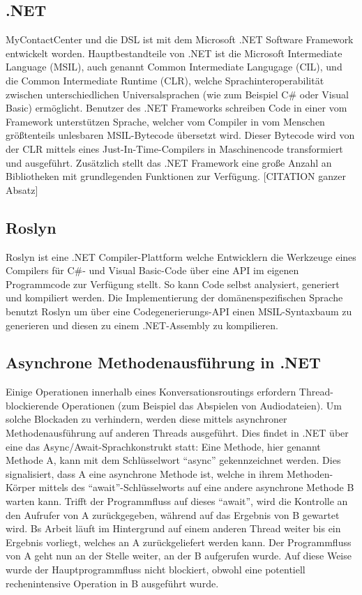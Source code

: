 \subsection{.NET}
MyContactCenter und die DSL ist mit dem Microsoft .NET Software Framework entwickelt worden. Hauptbestandteile von .NET ist die Microsoft Intermediate Language (MSIL), auch genannt Common Intermediate Langugage (CIL), und die Common Intermediate Runtime (CLR), welche Sprachinteroperabilität zwischen unterschiedlichen Universalsprachen (wie zum Beispiel C\# oder Visual Basic) ermöglicht. Benutzer des .NET Frameworks schreiben Code in einer vom Framework unterstützen Sprache, welcher vom Compiler in vom Menschen größtenteils unlesbaren MSIL-Bytecode übersetzt wird. Dieser Bytecode wird von der CLR mittels eines Just-In-Time-Compilers in Maschinencode transformiert und ausgeführt. Zusätzlich stellt das .NET Framework eine große Anzahl an Bibliotheken mit grundlegenden Funktionen zur Verfügung. [CITATION ganzer Absatz]

\subsection{Roslyn}
Roslyn ist eine .NET Compiler-Plattform welche Entwicklern die Werkzeuge eines Compilers für C\#- und Visual Basic-Code über eine API im eigenen Programmcode zur Verfügung stellt. So kann Code selbst analysiert, generiert und kompiliert werden. Die Implementierung der domänenspezifischen Sprache benutzt Roslyn um über eine Codegenerierungs-API einen MSIL-Syntaxbaum zu generieren und diesen zu einem .NET-Assembly zu kompilieren.

\subsection{Asynchrone Methodenausführung in .NET}
Einige Operationen innerhalb eines Konversationsroutings erfordern Thread-blockierende Operationen (zum Beispiel das Abspielen von Audiodateien). Um solche Blockaden zu verhindern, werden diese mittels asynchroner Methodenausführung auf anderen Threads ausgeführt. Dies findet in .NET über eine das Async/Await-Sprachkonstrukt statt: Eine Methode, hier genannt Methode A, kann mit dem Schlüsselwort ``async'' gekennzeichnet werden. Dies signalisiert, dass A eine asynchrone Methode ist, welche in ihrem Methoden-Körper mittels des ``await''-Schlüsselworts auf eine andere asynchrone Methode B warten kann. Trifft der Programmfluss auf dieses ``await'', wird die Kontrolle an den Aufrufer von A zurückgegeben, während auf das Ergebnis von B gewartet wird. Bs Arbeit läuft im Hintergrund auf einem anderen Thread weiter bis ein Ergebnis vorliegt, welches an A zurückgeliefert werden kann. Der Programmfluss von A geht nun an der Stelle weiter, an der B aufgerufen wurde. Auf diese Weise wurde der Hauptprogrammfluss nicht blockiert, obwohl eine potentiell rechenintensive Operation in B ausgeführt wurde.

